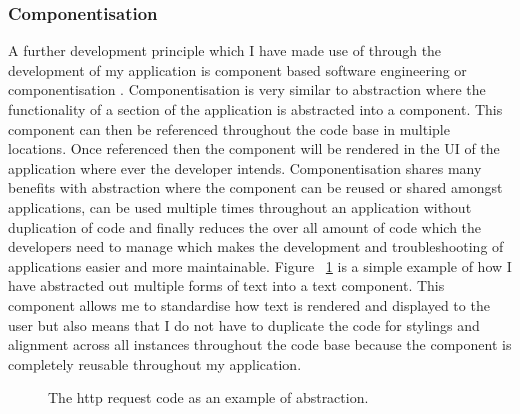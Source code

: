 \documentclass[a4paper,11pt]{report}
\begin{document}
\subsubsection{Componentisation}
A further development principle which I have made use of through the development of my application is component based software engineering or componentisation \cite{component}. Componentisation is very similar to abstraction where the functionality of a section of the application is abstracted into a component. This component can then be referenced throughout the code base in multiple locations. Once referenced then the component will be rendered in the UI of the application where ever the developer intends. Componentisation shares many benefits with abstraction where the component can be reused or shared amongst applications, can be used multiple times throughout an application without duplication of code and finally reduces the over all amount of code which the developers need to manage which makes the development and troubleshooting of applications easier and more maintainable. 
Figure ~\ref{fig:textComponent} is a simple example of how I have abstracted out multiple forms of text into a text component. This component allows me to standardise how text is rendered and displayed to the user but also means that I do not have to duplicate the code for stylings and alignment across all instances throughout the code base because the component is completely reusable throughout my application.

\begin{figure}[H]
    \centering
    \caption{The http request code as an example of abstraction.}
    \label{fig:textComponent}
    \end{figure}
\end{document}

